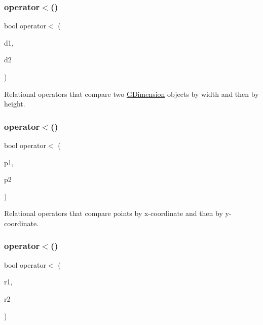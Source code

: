 \subsubsection{\texorpdfstring{operator$<$()}{operator<()}\hspace{0.1cm}{\footnotesize\ttfamily [1/4]}}
{\footnotesize\ttfamily bool operator$<$ (\begin{DoxyParamCaption}\item[{const \mbox{\hyperlink{structsgl_1_1GDimension}{G\+Dimension}} \&}]{d1,  }\item[{const \mbox{\hyperlink{structsgl_1_1GDimension}{G\+Dimension}} \&}]{d2 }\end{DoxyParamCaption})}



Relational operators that compare two \mbox{\hyperlink{structsgl_1_1GDimension}{G\+Dimension}} objects by width and then by height. 

\mbox{\label{namespacesgl_a8ef7ca0053558918c5f7bcae257c1bec}} 
\subsubsection{\texorpdfstring{operator$<$()}{operator<()}\hspace{0.1cm}{\footnotesize\ttfamily [2/4]}}
{\footnotesize\ttfamily bool operator$<$ (\begin{DoxyParamCaption}\item[{const \mbox{\hyperlink{structsgl_1_1GPoint}{G\+Point}} \&}]{p1,  }\item[{const \mbox{\hyperlink{structsgl_1_1GPoint}{G\+Point}} \&}]{p2 }\end{DoxyParamCaption})}



Relational operators that compare points by x-\/coordinate and then by y-\/coordinate. 

\mbox{\label{namespacesgl_a4a0fc8587bc8eccebfdd62416942c5d8}} 
\subsubsection{\texorpdfstring{operator$<$()}{operator<()}\hspace{0.1cm}{\footnotesize\ttfamily [3/4]}}
{\footnotesize\ttfamily bool operator$<$ (\begin{DoxyParamCaption}\item[{const \mbox{\hyperlink{structsgl_1_1GRectangle}{G\+Rectangle}} \&}]{r1,  }\item[{const \mbox{\hyperlink{structsgl_1_1GRectangle}{G\+Rectangle}} \&}]{r2 }\end{DoxyParamCaption})}



